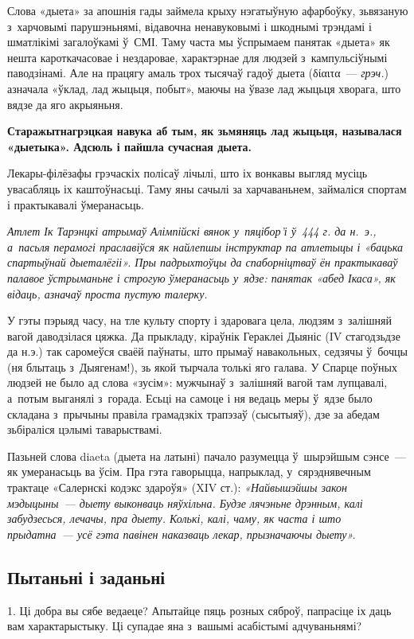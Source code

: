 Слова «дыета» за апошнія гады займела крыху нэгатыўную афарбоўку, зьвязаную з~харчовымі парушэньнямі, відавочна ненавуковымі і шкоднымі трэндамі і шматлікімі загалоўкамі ў~СМІ. Таму часта мы ўспрымаем панятак «дыета» як нешта кароткачасовае і нездаровае, характэрнае для людзей з~кампульсіўнымі паводзінамі. Але на працягу амаль трох тысячаў гадоў дыета (δίαιτα~--- \emph{грэч.}) азначала «ўклад, лад жыцьця, побыт», маючы на ўвазе лад жыцьця хворага, што вядзе да яго акрыяньня. 

\textbf{Старажытнагрэцкая навука аб тым, як зьмяняць лад жыцьця, называлася «дыетыка». Адсюль і пайшла сучасная дыета.}

Лекары-філёзафы грэчаскіх полісаў лічылі, што іх вонкавы выгляд мусіць увасабляць іх каштоўнасьці. Таму яны сачылі за харчаваньнем, займаліся спортам і практыкавалі ўмеранасьць. 

\emph{Атлет Ік Тарэнцкі атрымаў Алімпійскі вянок у~пяцібор'і ў~444 г. да н.~э., а~пасьля перамогі праславіўся як найлепшы інструктар па атлетыцы і «бацька спартыўнай дыеталёгіі». Пры падрыхтоўцы да спаборніцтваў ён практыкаваў палавое ўстрыманьне і строгую ўмеранасьць у~ядзе: панятак «абед Ікаса», як відаць, азначаў проста пустую талерку.}

У гэты пэрыяд часу, на тле культу спорту і здаровага цела, людзям з~залішняй вагой даводзілася цяжка. Да прыкладу, кіраўнік Гераклеі Дыяніс (IV стагодзьдзе да н.э.) так саромеўся сваёй паўнаты, што прымаў навакольных, седзячы ў~бочцы (ня блытаць з~Дыягенам!), зь якой тырчала толькі яго галава. У Спарце поўных людзей не было ад слова «зусім»: мужчынаў з~залішняй вагой там лупцавалі, а~потым выганялі з~горада. Есьці на самоце і ня ведаць меры ў~ядзе было складана з~прычыны правіла грамадзкіх трапэзаў (сысытыяў), дзе за абедам зьбіраліся цэлымі таварыствамі.

Пазьней слова diaeta (дыета на латыні) пачало разумецца ў~шырэйшым сэнсе~--- як умеранасьць ва ўсім. Пра гэта гаворыцца, напрыклад, у~сярэднявечным трактаце «Салернскі кодэкс здароўя» (XIV ст.): \emph{«Найвышэйшы закон мэдыцыны~--- дыету выконваць няўхільна. Будзе лячэньне дрэнным, калі забудзесься, лечачы, пра дыету. Колькі, калі, чаму, як часта і што прыдатна~--- усё гэта павінен наказваць лекар, прызначаючы дыету».}

\subsection*{Пытаньні і заданьні}

1. Ці добра вы сябе ведаеце? Апытайце пяць розных сяброў, папрасіце іх даць вам характарыстыку. Ці супадае яна з~вашымі асабістымі адчуваньнямі?

